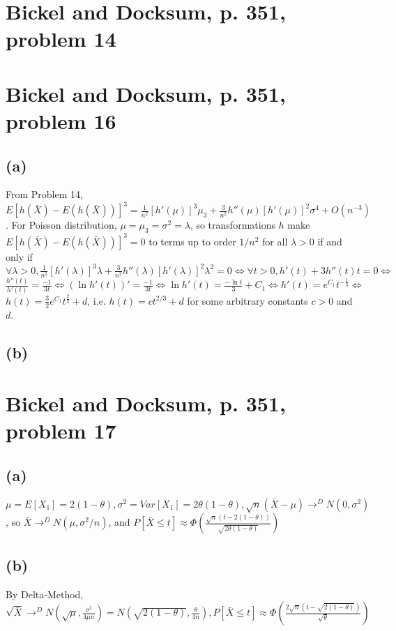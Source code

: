 \section{Bickel and Docksum, p. 351, problem 14}

\section{Bickel and Docksum, p. 351, problem 16}
\subsection*{(a)}
From Problem 14,
$
E[h(\bar{X}) - E(h(\bar{X}))]^3 =
\frac{1}{n^2}[h'(\mu)]^3 \mu_3
+
\frac{3}{n^2}h''(\mu)[h'(\mu)]^2 \sigma^4
+ O(n^{-3})
$.
For Poisson distribution,
$\mu=\mu_3=\sigma^2=\lambda$,
so transformations $h$ make \\
$
E[h(\bar{X}) - E(h(\bar{X}))]^3 = 0
$
to terms up to order $1/n^2$ for all $\lambda>0$
if and only if \\
$
\forall \lambda>0,
\frac{1}{n^2}[h'(\lambda)]^3 \lambda
+
\frac{3}{n^2}h''(\lambda)[h'(\lambda)]^2 \lambda^2
=0
\Leftrightarrow
\forall t>0,
h'(t)
+
3h''(t)t
=0
\Leftrightarrow
$ \\
$
\frac{h''(t)}{h'(t)}
=\frac{-1}{3t}
\Leftrightarrow
(\ln h'(t))'
=\frac{-1}{3t}
\Leftrightarrow
\ln h'(t)
= \frac{-\ln t}{3} + C_1
\Leftrightarrow
h'(t)
= e^{C_1} t^{-\frac{1}{3}}
\Leftrightarrow
$\\
$
h(t)
= \frac{3}{2}e^{C_1} t^{\frac{2}{3}} + d
$,
i.e.
$
h(t)
= ct^{2/3} + d
$
for some arbitrary constants $c>0$ and $d$.

\subsection*{(b)}

\section{Bickel and Docksum, p. 351, problem 17}
\subsection*{(a)}
$
\mu = E[X_1] = 2(1-\theta),
\sigma^2 = Var[X_1] = 2\theta(1-\theta),
\sqrt{n}(\bar{X}-\mu) \to^{D} N(0, \sigma^2)
$,
so
$
\bar{X} \to^{D} N(\mu, \sigma^2/n)
$,
and
$
P[\bar{X} \leq t] \approx
\Phi\left(\frac{\sqrt{n}(t-2(1-\theta))}{\sqrt{2\theta(1-\theta)}}\right)
$

\subsection*{(b)}
By Delta-Method,
$
\sqrt{\bar{X}} \to^{D}
N(\sqrt{\mu}, \frac{\sigma^2}{4\mu n})
=
N(\sqrt{2(1-\theta)}, \frac{\theta}{4n})
,
P[\bar{X} \leq t] \approx
\Phi\left(\frac{2\sqrt{n}(t-\sqrt{2(1-\theta)})}{\sqrt{\theta}}\right)
$

